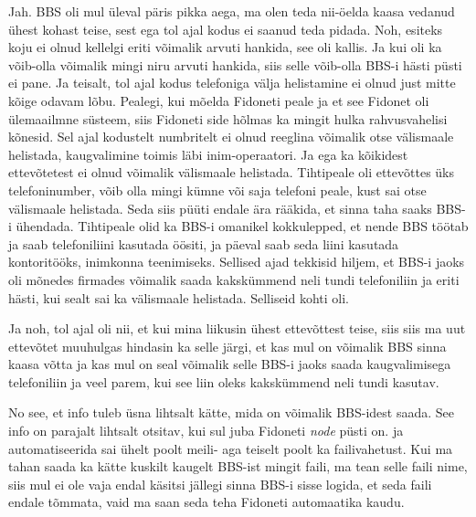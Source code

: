 Jah. BBS  oli mul üleval päris pikka aega, ma olen teda nii-öelda kaasa vedanud  ühest kohast teise, sest ega tol ajal kodus ei saanud teda pidada. Noh, esiteks koju ei olnud kellelgi eriti võimalik arvuti hankida, see oli kallis. Ja kui oli ka võib-olla võimalik mingi niru arvuti hankida, siis selle  võib-olla BBS-i hästi püsti ei pane. Ja teisalt, tol ajal kodus telefoniga välja helistamine ei olnud just mitte kõige odavam lõbu. Pealegi, kui mõelda Fidoneti peale ja et see Fidonet  oli ülemaailmne süsteem, siis Fidoneti side hõlmas ka mingit hulka rahvusvahelisi kõnesid. Sel ajal kodustelt numbritelt ei olnud reeglina võimalik otse  välismaale helistada, kaugvalimine toimis läbi inim-operaatori. Ja ega ka kõikidest ettevõtetest  ei olnud võimalik välismaale helistada. Tihtipeale oli ettevõttes üks telefoninumber, võib olla mingi kümne või saja telefoni peale, kust sai otse välismaale helistada. Seda siis püüti endale ära rääkida, et sinna taha saaks BBS-i ühendada. Tihtipeale olid ka BBS-i omanikel kokkulepped, et nende BBS töötab ja saab telefoniliini kasutada öösiti, ja päeval saab seda liini kasutada kontoritööks, inimkonna teenimiseks. Sellised ajad tekkisid hiljem, et BBS-i jaoks oli mõnedes firmades võimalik saada kakskümmend neli tundi telefoniliin ja eriti hästi, kui sealt sai ka välismaale helistada. Selliseid kohti oli. 

Ja noh, tol ajal oli nii, et kui mina liikusin ühest ettevõttest teise, siis siis ma uut ettevõtet muuhulgas hindasin ka selle järgi, et kas mul on võimalik BBS sinna kaasa võtta ja kas mul on seal võimalik selle BBS-i jaoks saada  kaugvalimisega telefoniliin ja veel parem, kui see liin oleks  kakskümmend neli tundi kasutav.


No see, et info tuleb üsna lihtsalt kätte, mida on võimalik BBS-idest saada. See info on parajalt lihtsalt otsitav, kui sul juba Fidoneti \emph{node} püsti on. ja automatiseerida sai ühelt poolt meili-  aga teiselt poolt ka failivahetust. Kui ma tahan saada ka kätte kuskilt kaugelt BBS-ist mingit faili, ma tean selle faili nime, siis mul ei ole vaja endal käsitsi jällegi sinna BBS-i sisse logida, et seda faili endale tõmmata, vaid ma saan seda teha Fidoneti automaatika kaudu.

